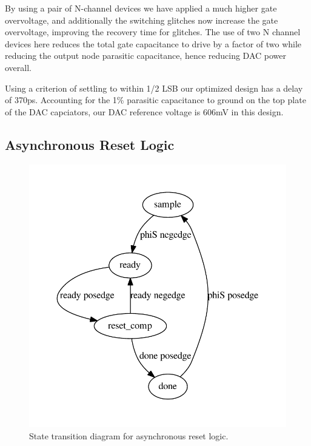 \documentclass[10pt,journal]{IEEEtran}\usepackage{longtable}
\begin{document}
By using a pair of N-channel devices we have applied a much higher gate overvoltage, and additionally the switching glitches now increase the gate overvoltage, improving the recovery time for glitches.
The use of two N channel devices here reduces the total gate capacitance to drive by a factor of two while reducing the output node parasitic capacitance, hence reducing DAC power overall.

Using a criterion of settling to within 1/2 LSB our optimized design has a delay of 370ps.
Accounting for the 1\% parasitic capacitance to ground on the top plate of the DAC capciators, our DAC reference voltage is 606mV in this design. 




\subsection{Asynchronous Reset Logic}

\begin{figure}[tbph]
\begin{center}
\includegraphics[width=1\columnwidth]{async.pdf}
\caption{State transition diagram for asynchronous reset logic.}
\label{fig:AsyncStateMachine}
\end{center}
\end{figure}
\end{document}
